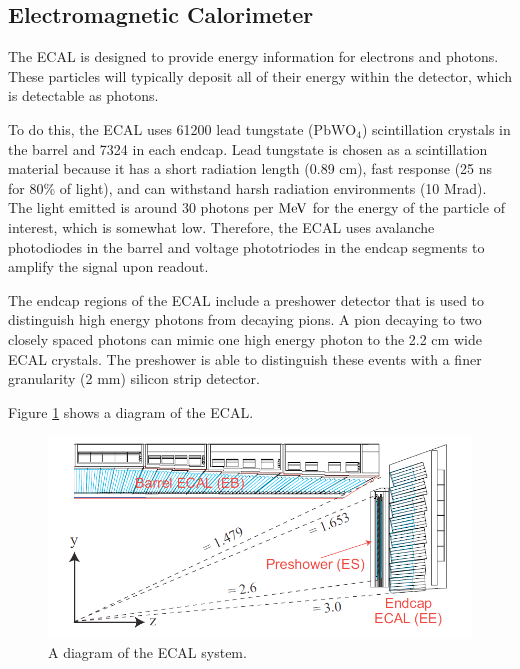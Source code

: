 \subsection{Electromagnetic Calorimeter}
The ECAL is designed to provide energy information for electrons and photons.  
These particles will typically deposit all of their energy within the detector, which is detectable as photons. 

To do this, the ECAL uses 61200 lead tungstate ($\mathrm{PbWO_4}$) scintillation crystals in the barrel and 7324 in each endcap.  
Lead tungstate is chosen as a scintillation material because it has a short radiation length (0.89 cm), fast response (25 ns for 80\% of light), and can 
withstand harsh radiation environments (10 Mrad).
The light emitted is around 30 photons per $\mathrm{MeV}$ for the energy of the particle of interest, which is somewhat low.  
Therefore, the ECAL uses avalanche photodiodes in the barrel and voltage phototriodes in the endcap segments to amplify the signal upon readout.  

The endcap regions of the ECAL include a preshower detector that is used to distinguish high energy photons from decaying pions.  
A pion decaying to two closely spaced photons can mimic one high energy photon to the 2.2 cm wide ECAL crystals.  
The preshower is able to distinguish these events with a finer granularity (2 mm) silicon strip detector.   
 
Figure \ref{figs:CMSecal} shows a diagram of the ECAL.    
\begin{figure}
\begin{center}
\includegraphics[width=1.0\linewidth]{figs/CMSecal.png}
\caption{A diagram of the ECAL system.}
\label{figs:CMSecal}
\end{center}
\end{figure}
  





